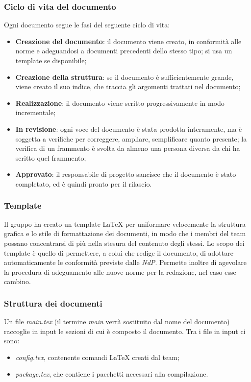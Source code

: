 	\subsubsection{Ciclo di vita del documento}
	Ogni documento segue le fasi del seguente ciclo di vita:
	\begin{itemize}
		\item \textbf{Creazione del documento}: il documento viene creato, in conformità alle norme e adeguandosi a documenti precedenti dello stesso tipo; si usa un template se disponibile;
		\item \textbf{Creazione della struttura}: se il documento è sufficientemente grande, viene creato il suo indice, che traccia gli argomenti trattati nel documento;
		\item \textbf{Realizzazione}: il documento viene scritto progressivamente in modo incrementale;
		\item \textbf{In revisione}: ogni voce del documento è stata prodotta interamente, ma è soggetta a verifiche per correggere, ampliare, semplificare quanto presente; la verifica di un frammento è svolta da almeno una persona diversa da chi ha scritto quel frammento;
		\item \textbf{Approvato}: il responsabile di progetto sancisce che il documento è stato completato, ed è quindi pronto per il rilascio.
	\end{itemize}

	\subsubsection{Template}
	Il gruppo ha creato un template \LaTeX{} per uniformare velocemente la struttura grafica e lo stile di formattazione dei documenti, in modo che i membri del team possano concentrarsi di più nella stesura del contenuto degli stessi. Lo scopo dei template è quello di permettere, a colui che redige il documento, di adottare automaticamente le conformità previste dalle \textit{NdP}. Permette inoltre di agevolare la procedura di adeguamento alle nuove norme per la redazione, nel caso esse cambino.
	\subsubsection{Struttura dei documenti}
	Un file \textit{main.tex} (il termine \textit{main} verrà sostituito dal nome del documento) raccoglie in input le sezioni di cui è composto il documento. Tra i file in input ci sono:
	\begin{itemize}
		\item \textit{config.tex}, contenente comandi \LaTeX{} creati dal team;
		\item \textit{package.tex}, che contiene i pacchetti necessari alla compilazione.
	\end{itemize}

